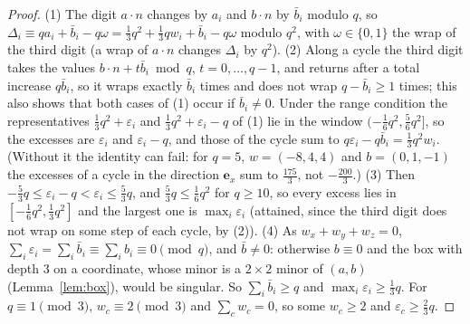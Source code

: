 \documentclass[11pt]{amsart}
\theoremstyle{definition}
\theoremstyle{plain}
\newcommand{\e}{\mathbf{e}}
\begin{document}
\begin{proof}
(1) The digit $a\cdot n$ changes by $a_i$ and $b\cdot n$ by $\bar b_i$ modulo $q$, so $\Delta_i\equiv qa_i+\bar b_i-q\omega=\frac13q^2+\frac13qw_i+\bar b_i-q\omega$ modulo $q^2$, with $\omega\in\{0,1\}$ the wrap of the third digit (a wrap of $a\cdot n$ changes $\Delta_i$ by $q^2$). (2) Along a cycle the third digit takes the values $b\cdot n+t\bar b_i\bmod q$, $t=0,\dots,q-1$, and returns after a total increase $q\bar b_i$, so it wraps exactly $\bar b_i$ times and does not wrap $q-\bar b_i\ge1$ times; this also shows that both cases of (1) occur if $\bar b_i\ne0$. Under the range condition the representatives $\frac13q^2+\varepsilon_i$ and $\frac13q^2+\varepsilon_i-q$ of (1) lie in the window $(-\frac16q^2,\frac56q^2]$, so the excesses are $\varepsilon_i$ and $\varepsilon_i-q$, and those of the cycle sum to $q\varepsilon_i-q\bar b_i=\frac13q^2w_i$. (Without it the identity can fail: for $q=5$, $w=(-8,4,4)$ and $b=(0,1,-1)$ the excesses of a cycle in the direction $\e_x$ sum to $\frac{175}3$, not $-\frac{200}3$.) (3) Then $-\frac53q\le\varepsilon_i-q<\varepsilon_i\le\frac53q$, and $\frac53q\le\frac16q^2$ for $q\ge10$, so every excess lies in $[-\frac16q^2,\frac13q^2]$ and the largest one is $\max_i\varepsilon_i$ (attained, since the third digit does not wrap on some step of each cycle, by (2)). (4) As $w_x+w_y+w_z=0$, $\sum_i\varepsilon_i=\sum_i\bar b_i\equiv\sum_ib_i\equiv0\pmod q$, and $\bar b\ne0$: otherwise $b\equiv0$ and the box with depth $3$ on a coordinate, whose minor is a $2\times2$ minor of $(a,b)$ (Lemma~\ref{lem:box}), would be singular. So $\sum_i\bar b_i\ge q$ and $\max_i\varepsilon_i\ge\frac13q$. For $q\equiv1\pmod3$, $w_c\equiv2\pmod3$ and $\sum_cw_c=0$, so some $w_c\ge2$ and $\varepsilon_c\ge\frac23q$.
\end{proof}
\end{document}
